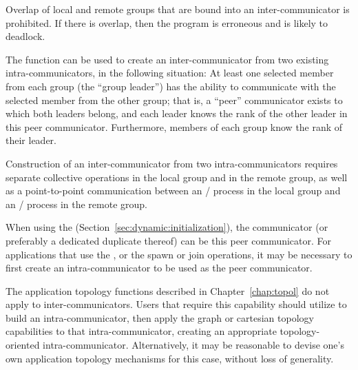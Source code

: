 Overlap of local and remote groups that are bound into an
inter-communicator is prohibited. If there is overlap, then the
program is erroneous and is likely to deadlock.

The function  can be used to create an
inter-communicator from two existing intra-communicators, in the following
situation: At least one selected member from each group (the ``group
leader'') has the ability to communicate with the selected member from
the other group; that is, a ``peer'' communicator exists to which both
leaders belong, and each leader knows the rank of the other leader in
this peer communicator.
Furthermore, members of each group know the rank of their leader.

Construction of an inter-communicator from two intra-communicators requires
separate collective operations in the local group and in the remote group, as
well as a point-to-point communication between an \MPI/ process in the local group
and an \MPI/ process in the remote group.

When using the \wpm{} (Section~\ref{sec:dynamic:initialization}), the 
communicator (or preferably a dedicated duplicate thereof)
can be this peer communicator.
For applications that use the \spm{}, or the spawn or join operations, it may be necessary
to first create an intra-communicator to be used as the peer communicator.

The application topology functions described in Chapter~\ref{chap:topol} do
not apply to inter-communicators. Users that require this capability should
utilize  to build an intra-communicator, then
apply the graph or cartesian topology capabilities to that intra-communicator,
creating an appropriate topology-oriented intra-communicator. Alternatively,
it may be reasonable to devise one's own application topology mechanisms for
this case, without loss of generality.



